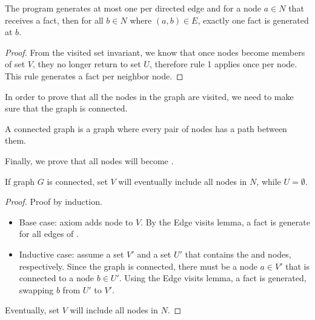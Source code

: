 \begin{lemma}
The program generates at most one  per directed edge and for a node
$a \in N$ that receives a  fact, then for all $b \in N$ where $(a,
b) \in E$, exactly one  fact is generated at $b$.
\end{lemma}
\begin{proof}
From the visited set invariant, we know that once nodes become members of set $V$,
they no longer return to set $U$, therefore rule 1 applies once per
node. This rule generates a  fact per neighbor node.
\end{proof}

In order to prove that all the nodes in the graph are visited, we need to make
sure that the graph is connected.

\begin{definition}
A connected graph is a graph where every pair of nodes has a path between them.
\end{definition}

Finally, we prove that all nodes will become .

\begin{theorem}
If graph $G$ is connected, set $V$ will eventually include all nodes in $N$,
while $U = \emptyset$.
\end{theorem}
\begin{proof}
Proof by induction.

\begin{itemize}
   \item Base case: axiom  adds node  to $V$. By
   the Edge visits lemma, a  fact is generate for all edges of
   .
   \item Inductive case: assume a set $V'$ and a set $U'$ that contains the
    and  nodes, respectively. Since the graph
   is connected, there must be a node $a \in V'$ that is connected to a node $b
   \in U'$. Using the Edge visits lemma, a  fact is generated,
   swapping $b$ from $U'$ to $V'$.
\end{itemize}

Eventually, set $V$ will include all nodes in $N$.
\end{proof}

